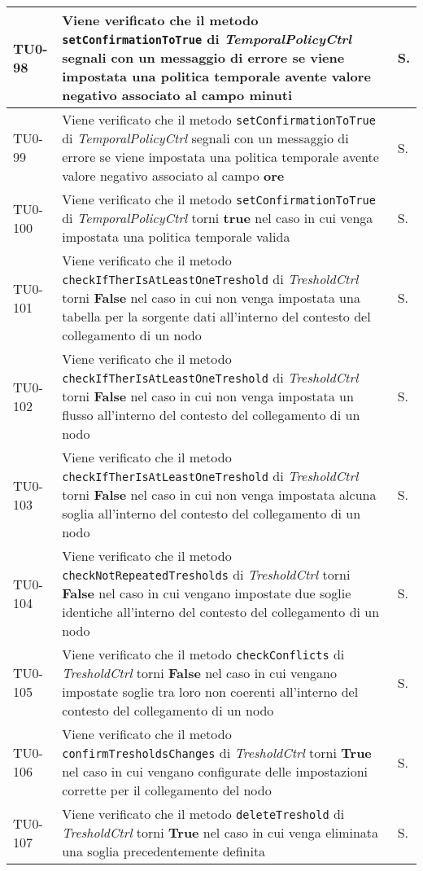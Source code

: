 \begin{longtable}{|C{.15\textwidth}|m{.66\textwidth}|C{.10\textwidth}|}
\hline
TU0-98 & Viene verificato che il metodo \texttt{setConfirmationToTrue} di \textit{TemporalPolicyCtrl} segnali con un messaggio di errore se viene impostata una politica temporale avente valore negativo associato al campo \textbf{minuti} & S.\\
\hline
{}TU0-99 & Viene verificato che il metodo \texttt{setConfirmationToTrue} di \textit{TemporalPolicyCtrl} segnali con un messaggio di errore se viene impostata una politica temporale avente valore negativo associato al campo \textbf{ore} & S.\\
\hline
TU0-100 & Viene verificato che il metodo \texttt{setConfirmationToTrue} di \textit{TemporalPolicyCtrl} torni \textbf{true} nel caso in cui venga impostata una politica temporale valida & S.\\
\hline
{}TU0-101 & Viene verificato che il metodo \texttt{checkIfTherIsAtLeastOneTreshold} di \textit{TresholdCtrl} torni \textbf{False} nel caso in cui non venga impostata una tabella per la sorgente dati all'interno del contesto del collegamento di un nodo & S.\\
\hline
TU0-102 & Viene verificato che il metodo \texttt{checkIfTherIsAtLeastOneTreshold} di \textit{TresholdCtrl} torni \textbf{False} nel caso in cui non venga impostata un flusso all'interno del contesto del collegamento di un nodo & S.\\
\hline
{}TU0-103 & Viene verificato che il metodo \texttt{checkIfTherIsAtLeastOneTreshold} di \textit{TresholdCtrl} torni \textbf{False} nel caso in cui non venga impostata alcuna soglia all'interno del contesto del collegamento di un nodo & S.\\
\hline
TU0-104 & Viene verificato che il metodo \texttt{checkNotRepeatedTresholds} di \textit{TresholdCtrl} torni \textbf{False} nel caso in cui vengano impostate due soglie identiche all'interno del contesto del collegamento di un nodo & S.\\
\hline
{}TU0-105 & Viene verificato che il metodo \texttt{checkConflicts} di \textit{TresholdCtrl} torni \textbf{False} nel caso in cui vengano impostate soglie tra loro non coerenti all'interno del contesto del collegamento di un nodo & S.\\
\hline
TU0-106 & Viene verificato che il metodo \texttt{confirmTresholdsChanges} di \textit{TresholdCtrl} torni \textbf{True} nel caso in cui vengano configurate delle impostazioni corrette per il collegamento del nodo & S.\\
\hline
{}TU0-107 & Viene verificato che il metodo \texttt{deleteTreshold} di \textit{TresholdCtrl} torni \textbf{True} nel caso in cui venga eliminata una soglia precedentemente definita & S.\\

\end{longtable}
